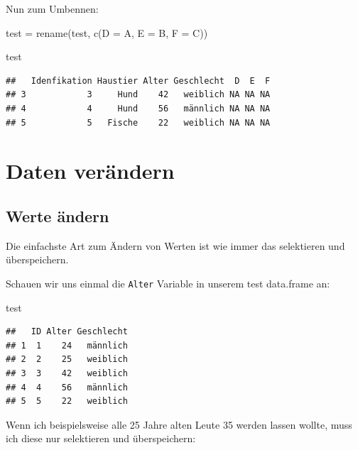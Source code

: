 \documentclass[
]{book}
\newenvironment{Shaded}{\begin{snugshade}}{\end{snugshade}}
\newcommand{\AttributeTok}[1]{\textcolor[rgb]{0.77,0.63,0.00}{#1}}
\newcommand{\DecValTok}[1]{\textcolor[rgb]{0.00,0.00,0.81}{#1}}
\newcommand{\FunctionTok}[1]{\textcolor[rgb]{0.00,0.00,0.00}{#1}}
\newcommand{\NormalTok}[1]{#1}
\newcommand{\OtherTok}[1]{\textcolor[rgb]{0.56,0.35,0.01}{#1}}
\newcommand{\SpecialCharTok}[1]{\textcolor[rgb]{0.00,0.00,0.00}{#1}}
\begin{document}
Nun zum Umbennen:

\begin{Shaded}
\begin{Highlighting}[]
\NormalTok{test }\OtherTok{=} \FunctionTok{rename}\NormalTok{(test, }\FunctionTok{c}\NormalTok{(}\AttributeTok{D =}\NormalTok{ A, }
                      \AttributeTok{E =}\NormalTok{ B,}
                      \AttributeTok{F =}\NormalTok{ C))}

\NormalTok{test}
\end{Highlighting}
\end{Shaded}

\begin{verbatim}
##   Idenfikation Haustier Alter Geschlecht  D  E  F
## 3            3     Hund    42   weiblich NA NA NA
## 4            4     Hund    56   männlich NA NA NA
## 5            5   Fische    22   weiblich NA NA NA
\end{verbatim}

\hypertarget{daten-veruxe4ndern}{%
\section{Daten verändern}\label{daten-veruxe4ndern}}

\hypertarget{werte-uxe4ndern}{%
\subsection{Werte ändern}\label{werte-uxe4ndern}}

Die einfachste Art zum Ändern von Werten ist wie immer das selektieren und überspeichern.

Schauen wir uns einmal die \texttt{Alter} Variable in unserem test data.frame an:

\begin{Shaded}
\begin{Highlighting}[]
\NormalTok{test}
\end{Highlighting}
\end{Shaded}

\begin{verbatim}
##   ID Alter Geschlecht
## 1  1    24   männlich
## 2  2    25   weiblich
## 3  3    42   weiblich
## 4  4    56   männlich
## 5  5    22   weiblich
\end{verbatim}

Wenn ich beispielsweise alle 25 Jahre alten Leute 35 werden lassen wollte, muss ich diese nur selektieren und überspeichern:

\begin{Shaded}
\end{Shaded}
\end{document}
